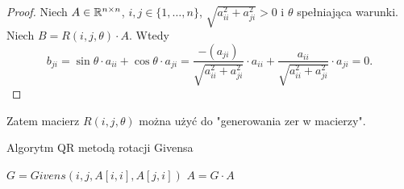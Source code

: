 \documentclass[12pt,a4paper]{report}
\newcommand{\mx}[1]{{#1}}
\begin{document}
\begin{proof}
Niech $\mx{A} \in \setR^{n \times n}$, $i,j \in \{1,\ldots,n\}$, $\sqrt{a_{ii}^{2} + a_{ji}^{2}} > 0$ i $\theta$ spełniająca warunki. Niech $\mx{B} = \mx{R}(i,j,\theta)\cdot \mx{A}$. Wtedy 
$$
b_{ji}= \sin\theta\cdot a_{ii} + \cos\theta\cdot a_{ji} = \frac{-(a_{ji})}{\sqrt{a_{ii}^{2} + a_{ji}^{2}}} \cdot a_{ii} + \frac{a_{ii}}{\sqrt{a_{ii}^{2} + a_{ji}^{2}}} \cdot a_{ji} = 0.
$$
\end{proof}
Zatem macierz $\mx{R}(i,j,\theta)$ można użyć do "generowania zer w macierzy".
\begin{algorithm}
\caption{Algorytm QR metodą rotacji Givensa}
\begin{algorithmic}
		\State $\mx{G} = Givens(i,j, \mx{A}[i,i], \mx{A}[j,i])$
		\State $\mx{A} = \mx{G}\cdot \mx{A}$
	\EndFor	
\EndFor
\end{algorithmic}
\end{algorithm}
\end{document}
